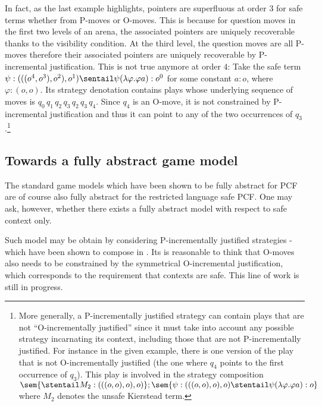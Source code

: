 
In fact, as the last example highlights, pointers are 
superfluous at order $3$ for safe terms whether from P-moves or O-moves. This is because for
question moves in the first two levels of an arena, the associated
pointers are uniquely recoverable thanks to the visibility
condition. At the third level, the question moves are all P-moves
therefore their associated pointers are uniquely recoverable by
P-incremental justification. This is not true anymore at order $4$:
Take the safe term $\psi:(((o^4,o^3),o^2),o^1) \sentail \psi
(\lambda \varphi . \varphi a) : o^0$ for some constant $a:o$, where
$\varphi:(o,o)$. Its strategy denotation contains plays whose
underlying sequence of moves is $q_0 \, q_1 \, q_2 \, q_3 \, q_2 \,
q_3 \, q_4$. Since $q_4$ is an O-move, it is not constrained by
P-incremental justification and thus it can point to any of the two
occurrences of $q_3$.\footnote{More generally, a P-incrementally
justified strategy can contain plays that are not ``O-incrementally
justified'' since it must take into account any possible strategy
incarnating its context, including those that are not
P-incrementally justified. For instance in the given example, there
is one version of the play that is not O-incrementally justified
(the one where $q_4$ points to the first occurrence of $q_3$). This
play is involved in the strategy composition $\sem{ \stentail M_2 :
(((o,o),o),o)} ; \sem{ \psi:(((o,o),o),o) \stentail \psi (\lambda
\varphi . \varphi a):o}$ where $M_2$ denotes the unsafe Kierstead
term.}


\subsection*{Towards a fully abstract game model}\hfill

The standard game models which have been shown to be fully abstract
for PCF \cite{abramsky94full,hylandong_pcf} are of course also fully
abstract for the restricted language safe PCF. One may ask, however,
whether there exists a fully abstract model with respect to safe
context only.

Such model may be obtain by considering P-incrementally justified strategies
- which have been shown to compose in \cite{Blumphd}. Its is reasonable to think that
 O-moves also needs to be constrained by the symmetrical O-incremental justification, which corresponds to the requirement that contexts are safe. This line of work is still in progress.


